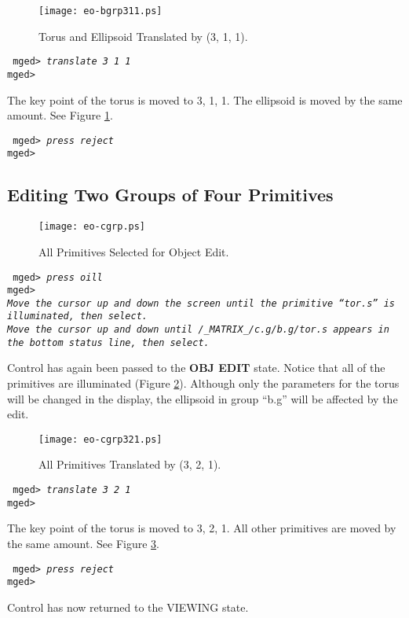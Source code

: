 \begin{figure}
\centering \texttt{[image: eo-bgrp311.ps]}
\caption{Torus and Ellipsoid Translated by (3, 1, 1).}
\label{eo-bgrp311}
\end{figure}

\noindent
{\tt
mged> {\em translate 3 1 1}\\
mged>\\
}

The key point of the torus is moved to 3, 1, 1. The ellipsoid is
moved by the same amount.  See Figure \ref{eo-bgrp311}.

\noindent
{\tt
mged> {\em press reject}\\
mged>\\
}

\subsection{Editing Two Groups of Four Primitives}

\begin{figure}
\centering \texttt{[image: eo-cgrp.ps]}
\caption{All Primitives Selected for Object Edit.}
\label{eo-cgrp}
\end{figure}

\noindent
{\tt
mged> {\em press oill}\\
mged>\\
{\em Move the cursor up and down the screen until the primitive ``tor.s''
is illuminated, then select.}\\
{\em Move the cursor up and down until {\tt /\_MATRIX\_/c.g/b.g/tor.s} appears
in the bottom status line, then select.}\\
}

Control has again been passed to the {\bf OBJ EDIT} state. Notice that
all of the primitives are illuminated (Figure \ref{eo-cgrp}).
Although only the parameters for the torus will be changed in the
display, the ellipsoid in group ``b.g'' will be affected by the edit.

\begin{figure}
\centering \texttt{[image: eo-cgrp321.ps]}
\caption{All Primitives Translated by (3, 2, 1).}
\label{eo-cgrp321}
\end{figure}

\noindent
{\tt
mged> {\em translate 3 2 1}\\
mged>\\
}

The key point of the torus is moved to 3, 2, 1. All other primitives are
moved by the same amount.  See Figure \ref{eo-cgrp321}.

\noindent
{\tt
mged> {\em press reject}\\
mged>\\
}

Control has now returned to the VIEWING state.
